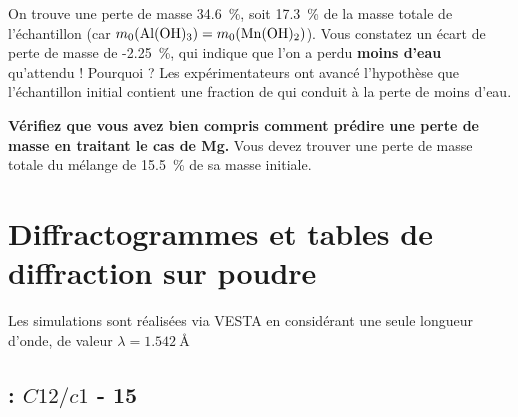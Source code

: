 \documentclass[twoside,a4paper,11pt,addpoints,answers]{exam}%
\begin{document}
On trouve une perte de masse \SI{34.6}{\percent}, soit \SI{17.3}{\percent} de la masse totale de l'échantillon (car $m_0 ( \ce{Al(OH)3} ) = m_0 (\ce{Mn(OH)2})$). Vous constatez un écart de perte de masse de -\SI{2.25}{\percent}, qui indique que l'on a perdu \textbf{moins d'eau} qu'attendu ! Pourquoi ? Les expérimentateurs ont avancé l'hypothèse que l'échantillon initial contient une fraction de  qui conduit à la perte de moins d'eau.

\textbf{Vérifiez que vous avez bien compris comment prédire une perte de masse en traitant le cas de Mg.} Vous devez trouver une perte de masse totale du mélange de \SI{15.5}{\percent} de sa masse initiale.







\newpage

\section{Diffractogrammes et tables de diffraction sur poudre}
\label{sec:diffracto}
Les simulations sont réalisées via VESTA en considérant une seule longueur d'onde, de valeur $\lambda = 1.542 ~ \si{\angstrom}$

\subsection{ : $C12/c1$ - 15}
\end{document}
